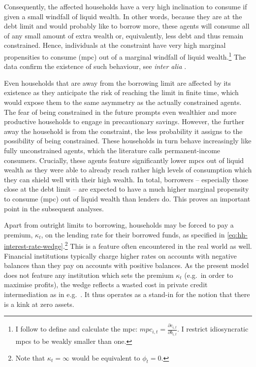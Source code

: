 \documentclass[12pt]{article} %
\numberwithin{equation}{section} %
\numberwithin{figure}{section}
\numberwithin{table}{section}
\begin{document}
Consequently, the affected households have a very high inclination to consume if given a small windfall of liquid wealth. In other words, because they are at the debt limit and would probably like to borrow more, these agents will consume all of any small amount of extra wealth or, equivalently, less debt and thus remain constrained. Hence, individuals at the constraint have very high marginal propensities to consume (\Gls{mpc}) out of a marginal windfall of liquid wealth.\footnote{I follow \textcite{gl2017} to define and calculate the \Gls{mpc}: $mpc_{i,t} = \frac{\partial c_{i,t}}{\partial b_{i,t}}$. I restrict idiosyncratic \Gls{mpc}s to be weakly smaller than one.} The data confirm the existence of such behaviour, see \textit{inter alia} \textcite{gross2002}.

Even households that are away from the borrowing limit are affected by its existence as they anticipate the risk of reaching the limit in finite time, which would expose them to the same asymmetry as the actually constrained agents. The fear of being constrained in the future prompts even wealthier and more productive households to engage in precautionary savings. However, the further away the household is from the constraint, the less probability it assigns to the possibility of being constrained. These households in turn behave increasingly like fully unconstrained agents, which the literature calls permanent-income consumers. Crucially, these agents feature significantly lower \Gls{mpc}s out of liquid wealth as they were able to already reach rather high levels of consumption which they can shield well with their high wealth. In total, borrowers -- especially those close at the debt limit -- are expected to have a much higher marginal propensity to consume (\Gls{mpc}) out of liquid wealth than lenders do. This proves an important point in the subsequent analyses.

Apart from outright limits to borrowing, households may be forced to pay a premium, $\kappa_t$, on the lending rate for their borrowed funds, as specified in \eqref{eq:hh-interest-rate-wedge}.\footnote{Note that $\kappa_t = \infty$ would be equivalent to $\phi_t=0$.} This is a feature often encountered in the real world as well. Financial institutions typically charge higher rates on accounts with negative balances than they pay on accounts with positive balances. As the present model does not feature any institution which sets the premium $\kappa_t$ (e.g.~in order to maximise profits), the wedge reflects a wasted cost in private credit intermediation as in e.g.~\textcite{bayer2023}. It thus operates as a stand-in for the notion that there is a kink at zero assets.
\end{document}

